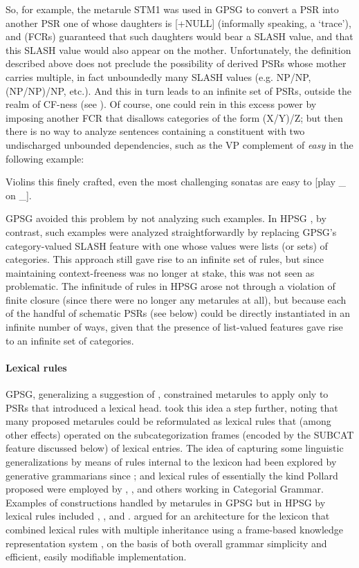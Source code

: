 \documentclass[output=paper]{langsci/langscibook}
\begin{document}
So, for example, the metarule STM1 was used in GPSG to convert a PSR into another PSR one of whose daughters is [+NULL] (informally speaking, a `trace'), and  (FCRs) guaranteed that such daughters would bear a SLASH value, and that this SLASH value would also appear on the mother. Unfortunately, the  definition described above does not preclude the possibility of derived PSRs whose mother carries multiple, in fact unboundedly many
SLASH values (e.g. NP/NP, (NP/NP)/NP, etc.). And this in turn leads to an infinite set of PSRs, outside the realm of CF-ness (see \citet{Ristad86}).  Of course, one could rein in this excess power by imposing another FCR that disallows categories of the form (X/Y)/Z; but then there is no way to analyze sentences containing a constituent with two undischarged unbounded dependencies, such as the VP complement of \emph{easy} in the following example:

\ea
\label{ex-violins}
Violins this finely crafted, even the most challenging sonatas are easy to [play \_ on \_].
\z

\noindent
GPSG avoided this problem by not analyzing such examples. In HPSG \citep{Pollard85a-u}, by contrast, such examples were analyzed straightforwardly by replacing GPSG's category-valued SLASH feature with one whose values were lists (or sets) of categories. This approach still gave rise to an infinite set of rules, but since maintaining context-freeness was no longer at stake, this was not seen as problematic. The infinitude of rules in HPSG arose not through a violation of finite closure (since there were no longer any metarules at all), but because each of the handful of schematic PSRs (see below) could be directly instantiated in an infinite number of ways, given that the presence of list-valued
features gave rise to an infinite set of categories.

\paragraph*{Lexical rules} GPSG, generalizing a suggestion of \citet{Flickinger1983}, constrained metarules to apply only to PSRs that introduced a lexical head. \citet{Pollard85a-u} took this idea a step further, noting that many proposed metarules could be reformulated as lexical rules that (among other effects) operated on the subcategorization frames (encoded by the SUBCAT feature discussed below) of lexical entries. The idea of capturing some linguistic generalizations by means of rules internal to the lexicon had been explored by generative grammarians since \citet{Jackendoff75a}; and lexical rules of essentially the kind Pollard proposed were employed by \citet{Bach83}, \citet{Dowty78a}, and others working in Categorial Grammar. Examples of constructions handled by metarules in GPSG but in HPSG by lexical rules included , , and . \citet*{FPW85a} argued for an architecture for the lexicon that combined lexical rules with multiple inheritance using a frame-based knowledge representation system \citep{Minsky1975}, on the basis of both overall grammar simplicity and efficient, easily modifiable implementation.
\end{document}
